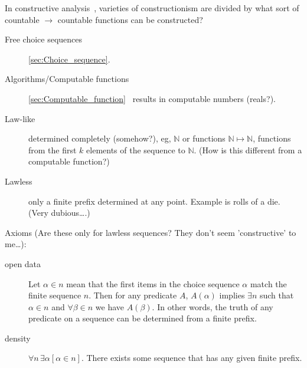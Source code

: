\label{Constructive analysis}

In constructive 
analysis~\cite{wiki:Constructive_analysis,
Bridger:2019,henle:2012:numbers},
varieties of constructionism are divided by
what sort of countable $\rightarrow$ countable functions can be 
constructed?~\cite{wiki:Constructivism_philosophy_of_mathematics}
\begin{description}
\item[Free choice sequences] 
\autoref{sec:Choice_sequence}\cite{wiki:Choice_sequence}.
\item[Algorithms/Computable functions] 
\autoref{sec:Computable_function}~\cite{wiki:Computable_function}
 results in computable numbers (reals?).
\end{description}

\label{sec:Choice_sequences}

\begin{description}
\item[Law-like] determined completely (somehow?),
eg, $\mathbb{N}$ or functions $\mathbb{N} \mapsto \mathbb{N}$,
functions from the first $k$ elements of the sequence to 
$\mathbb{N}$.
(How is this different from a computable function?)
\item[Lawless] only a finite prefix determined at any point.
Example is rolls of a die. (Very dubious\ldots.)
\end{description}

Axioms 
(Are these only for lawless sequences?
They don't seem 'constructive' to me\ldots):
\begin{description}
\item[open data] Let $\alpha \in n$ mean that the first items
in the choice sequence $\alpha$ match the finite sequence $n$.
Then for any predicate $A$,
$A(\alpha )$ implies  $\exists n$ such that
$\alpha \in n$ and $\forall \beta \in n$ we have $A(\beta )$.
In other words, the truth of any predicate on a sequence can be
determined from a finite prefix.
\item[density] $\forall n\,\exists \alpha [\alpha \in n]$.
There exists some sequence that has any given finite prefix.
\end{description}


\label{sec:Computable_function}
\cite{wiki:Computable_function}

